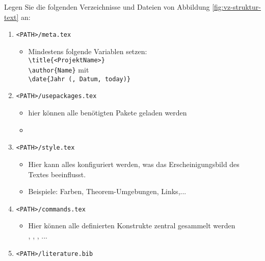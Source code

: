Legen Sie die folgenden Verzeichnisse und Dateien von Abbildung \ref{fig:vz-struktur-text} an:
\begin{enumerate}
	\item \texttt{<PATH>/meta.tex}
	      \begin{itemize}\small
		      \item Mindestens folgende Variablen setzen: \\
		            \hspace*{0.5cm}\texttt{\textbackslash title\{<ProjektName>\}}\\
		            \hspace*{0.5cm}\texttt{\textbackslash author\{Name\}} mit \\
		            \hspace*{0.5cm}\texttt{\textbackslash date\{Jahr (, Datum, today)\}}
	      \end{itemize}
	\item \texttt{<PATH>/usepackages.tex}
	      \begin{itemize}\small
		      \item hier können alle benötigten Pakete geladen werden 
		      \item[] ~~~~~
	      \end{itemize}
	\item \texttt{<PATH>/style.tex}
	      \begin{itemize}\small
		      \item Hier kann alles konfiguriert werden, was das Erscheinigungsbild des Textes beeinflusst.
		      \item Beispiele: Farben, Theorem-Umgebungen, Links,...
	      \end{itemize}
	\item \texttt{<PATH>/commands.tex}
	      \begin{itemize}\small
		      \item Hier können alle definierten Konstrukte zentral gesammelt werden\\
		            \hspace*{0.5cm} ,
		            \hspace*{0.5cm} ,
		            \hspace*{0.5cm} , ...
	      \end{itemize}
	\item \texttt{<PATH>/literature.bib}

\end{enumerate}
